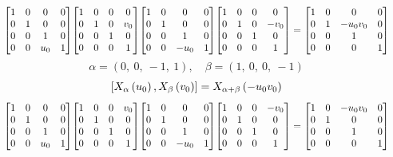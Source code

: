 \documentclass[11pt]{article}
\theoremstyle{definition}
\begin{document}
\[
\scaletoalign{\textwidth}{{\left[\begin{matrix}1 & 0 & 0 & 0\\0 & 1 & 0 & 0\\0 & 0 & 1 & 0\\0 & 0 & u_{0} & 1\end{matrix}\right]} {\left[\begin{matrix}1 & 0 & 0 & 0\\0 & 1 & 0 & v_{0}\\0 & 0 & 1 & 0\\0 & 0 & 0 & 1\end{matrix}\right]} {\left[\begin{matrix}1 & 0 & 0 & 0\\0 & 1 & 0 & 0\\0 & 0 & 1 & 0\\0 & 0 & - u_{0} & 1\end{matrix}\right]} {\left[\begin{matrix}1 & 0 & 0 & 0\\0 & 1 & 0 & - v_{0}\\0 & 0 & 1 & 0\\0 & 0 & 0 & 1\end{matrix}\right]} = {\left[\begin{matrix}1 & 0 & 0 & 0\\0 & 1 & - u_{0} v_{0} & 0\\0 & 0 & 1 & 0\\0 & 0 & 0 & 1\end{matrix}\right]}}
\]
\[
\alpha = \left( 0, \  0, \  -1, \  1\right), \quad \beta = \left( 1, \  0, \  0, \  -1\right)
\]
\[
\scaletoalign{\textwidth}{\left[ X_{\alpha}\left(u_{0}\right), X_{\beta}\left(v_{0}\right) \right] = X_{\alpha + \beta}\left(- u_{0} v_{0}\right)}
\]
\[
\scaletoalign{\textwidth}{{\left[\begin{matrix}1 & 0 & 0 & 0\\0 & 1 & 0 & 0\\0 & 0 & 1 & 0\\0 & 0 & u_{0} & 1\end{matrix}\right]} {\left[\begin{matrix}1 & 0 & 0 & v_{0}\\0 & 1 & 0 & 0\\0 & 0 & 1 & 0\\0 & 0 & 0 & 1\end{matrix}\right]} {\left[\begin{matrix}1 & 0 & 0 & 0\\0 & 1 & 0 & 0\\0 & 0 & 1 & 0\\0 & 0 & - u_{0} & 1\end{matrix}\right]} {\left[\begin{matrix}1 & 0 & 0 & - v_{0}\\0 & 1 & 0 & 0\\0 & 0 & 1 & 0\\0 & 0 & 0 & 1\end{matrix}\right]} = {\left[\begin{matrix}1 & 0 & - u_{0} v_{0} & 0\\0 & 1 & 0 & 0\\0 & 0 & 1 & 0\\0 & 0 & 0 & 1\end{matrix}\right]}}
\]
\end{document}
